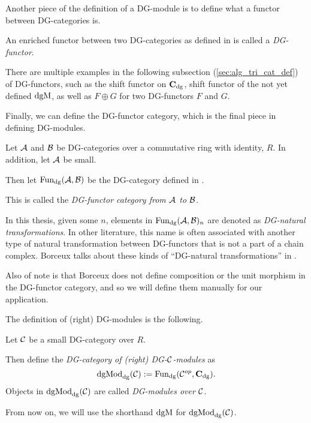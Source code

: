 Another piece of the definition of a DG-module is to define what a functor between DG-categories is.

\begin{definition}[DG-functor]
    An enriched functor between two DG-categories as defined in \cite[Definition 6.2.3]{Borceux_1994} is called a \emph{DG-functor}.
\end{definition}

There are multiple examples in the following subsection (\autoref{sec:alg_tri_cat_def}) of DG-functors, such as the shift functor on \( \operatorname{\mathbf{C}}_{\operatorname{dg}} \), shift functor of the not yet defined \( \operatorname{dgM} \), as well as \( F \oplus G \) for two DG-functors \( F \) and \( G \).

Finally, we can define the DG-functor category, which is the final piece in defining DG-modules.

\begin{definition}
    \label{def:dg_functor_category}
    Let \( {\mathcal{A}} \) and \( {\mathcal{B}} \) be DG-categories over a commutative ring with identity, \( R \). In addition, let \( {\mathcal{A}} \) be small.

    Then let \( \operatorname{Fun}_{\operatorname{dg}}({\mathcal{A}}, {\mathcal{B}}) \) be the DG-category defined in \cite[Proposition 6.3.1]{Borceux_1994}.

    This is called the \emph{DG-functor category from \( {\mathcal{A}} \) to \( {\mathcal{B}} \)}.
\end{definition}

In this thesis, given some \( n \), elements in \( \operatorname{Fun}_{\operatorname{dg}}({\mathcal{A}}, {\mathcal{B}})_n \) are denoted as \emph{DG-natural transformations}. In other literature, this name is often associated with another type of natural transformation between DG-functors that is not a part of a chain complex. Borceux talks about these kinds of ``DG-natural transformations'' in \cite[Definition 6.2.4]{Borceux_1994}.

Also of note is that Borceux does not define composition or the unit morphism in the DG-functor category, and so we will define them manually for our application.

The definition of (right) DG-modules is the following.

\begin{definition}
    Let \( {\mathcal{C}} \) be a small DG-category over \( R \).

    Then define the \emph{DG-category of (right) DG-\( {\mathcal{C}} \)-modules} as
    \[
        \operatorname{dgMod}_{\operatorname{dg}}({\mathcal{C}}) := \operatorname{Fun}_{\operatorname{dg}}({\mathcal{C}}^{op}, \operatorname{\mathbf{C}}_{\operatorname{dg}}).
    \]
    Objects in \( \operatorname{dgMod}_{\operatorname{dg}}({\mathcal{C}}) \) are called \emph{DG-modules over \( {\mathcal{C}} \)}.

    From now on, we will use the shorthand \( \operatorname{dgM} \) for \( \operatorname{dgMod}_{\operatorname{dg}}({\mathcal{C}}) \).
\end{definition}

